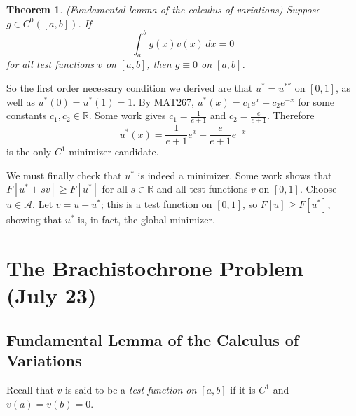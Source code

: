 \documentclass[11pt]{book}
\newcommand{\R}{\mathbb{R}}
\newtheorem{theorem}{Theorem}[subsection]
\begin{document}
\begin{theorem}
(Fundamental lemma of the calculus of variations) Suppose $g \in C^0([a,b])$. If
\[
\int_a^b g(x)v(x) \, dx = 0
\]
for all test functions $v$ on $[a,b]$, then $g \equiv 0$ on $[a,b]$.
\end{theorem}

So the first order necessary condition we derived are that $u^* = u^{*''}$ on $[0,1]$, as well as $u^*(0) = u^*(1) = 1$. By MAT267, $u^*(x) = c_1e^x + c_2e^{-x}$ for some constants $c_1, c_2 \in \R$. Some work gives $c_1 = \frac{1}{e+1}$ and $c_2 = \frac{e}{e + 1}$. Therefore
\[
u^*(x) = \frac{1}{e+1}e^x + \frac{e}{e+1}e^{-x}
\]
is the only $C^1$ minimizer candidate.

We must finally check that $u^*$ is indeed a minimizer. Some work shows that $F[u^* + sv] \geq F[u^*]$ for all $s \in \R$ and all test functions $v$ on $[0,1]$. Choose $u \in \mathcal{A}$. Let $v = u-u^*$; this is a test function on $[0,1]$, so $F[u] \geq F[u^*]$, showing that $u^*$ is, in fact, the global minimizer.

\newpage

\section{The Brachistochrone Problem (July 23)}

\subsection{Fundamental Lemma of the Calculus of Variations}

Recall that $v$ is said to be a \emph{test function on $[a,b]$} if it is $C^1$ and $v(a) = v(b) = 0$.
\end{document}
